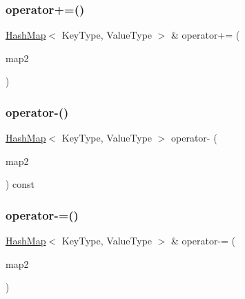 \mbox{\label{classHashMap_a24ad680f65038d2d6e9b406c8895ff29}} 
\subsubsection{\texorpdfstring{operator+=()}{operator+=()}}
{\footnotesize\ttfamily \mbox{\hyperlink{classHashMap}{Hash\+Map}}$<$ Key\+Type, Value\+Type $>$ \& operator+= (\begin{DoxyParamCaption}\item[{const \mbox{\hyperlink{classHashMap}{Hash\+Map}}$<$ Key\+Type, Value\+Type $>$ \&}]{map2 }\end{DoxyParamCaption})}

\mbox{\label{classHashMap_a19a5b1e806f70ded0ad8c8405cb76827}} 
\subsubsection{\texorpdfstring{operator-\/()}{operator-()}}
{\footnotesize\ttfamily \mbox{\hyperlink{classHashMap}{Hash\+Map}}$<$ Key\+Type, Value\+Type $>$ operator-\/ (\begin{DoxyParamCaption}\item[{const \mbox{\hyperlink{classHashMap}{Hash\+Map}}$<$ Key\+Type, Value\+Type $>$ \&}]{map2 }\end{DoxyParamCaption}) const}

\mbox{\label{classHashMap_aa83ed71e72154b05ef8383a1edf82a92}} 
\subsubsection{\texorpdfstring{operator-\/=()}{operator-=()}}
{\footnotesize\ttfamily \mbox{\hyperlink{classHashMap}{Hash\+Map}}$<$ Key\+Type, Value\+Type $>$ \& operator-\/= (\begin{DoxyParamCaption}\item[{const \mbox{\hyperlink{classHashMap}{Hash\+Map}}$<$ Key\+Type, Value\+Type $>$ \&}]{map2 }\end{DoxyParamCaption})}

